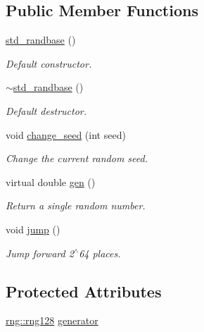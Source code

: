 \subsection*{Public Member Functions}
\begin{DoxyCompactItemize}
\item 
\hyperlink{classstdrand_1_1std__randbase_a8298d43186d6410f30ec0a77f0b90159}{std\+\_\+randbase} ()
\begin{DoxyCompactList}\small\item\em Default constructor. \end{DoxyCompactList}\item 
\hyperlink{classstdrand_1_1std__randbase_a5280080005689ab2ff6dae6de10a3faa}{$\sim$std\+\_\+randbase} ()
\begin{DoxyCompactList}\small\item\em Default destructor. \end{DoxyCompactList}\item 
void \hyperlink{classstdrand_1_1std__randbase_ae4d2a7ab5253b8d21ce4ede8f9988f24}{change\+\_\+seed} (int seed)
\begin{DoxyCompactList}\small\item\em Change the current random seed. \end{DoxyCompactList}\item 
virtual double \hyperlink{classstdrand_1_1std__randbase_a76e2d3761b0d1409f41dc73c8a87b0d5}{gen} ()
\begin{DoxyCompactList}\small\item\em Return a single random number. \end{DoxyCompactList}\item 
void \hyperlink{classstdrand_1_1std__randbase_a1f59d641467d33c51df65651212dac1f}{jump} ()
\begin{DoxyCompactList}\small\item\em Jump forward 2$^\wedge$64 places. \end{DoxyCompactList}\end{DoxyCompactItemize}
\subsection*{Protected Attributes}
\begin{DoxyCompactItemize}
\item 
\hyperlink{structrng_1_1rng128}{rng\+::rng128} \hyperlink{classstdrand_1_1std__randbase_a04dc8f49595791e10967b74a4b137b53}{generator}
\end{DoxyCompactItemize}


